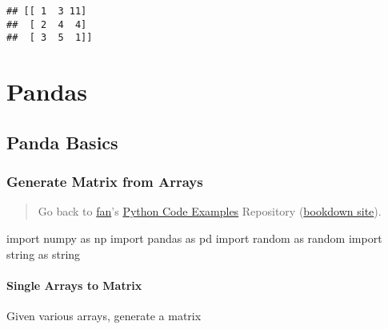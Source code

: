 \documentclass[
]{book}
\newenvironment{Shaded}{\begin{snugshade}}{\end{snugshade}}
\newcommand{\ImportTok}[1]{#1}
\newcommand{\NormalTok}[1]{#1}
\begin{document}
\begin{verbatim}
## [[ 1  3 11]
##  [ 2  4  4]
##  [ 3  5  1]]
\end{verbatim}

\hypertarget{pandas}{%
\chapter{Pandas}\label{pandas}}

\hypertarget{panda-basics}{%
\section{Panda Basics}\label{panda-basics}}

\hypertarget{generate-matrix-from-arrays-1}{%
\subsection{Generate Matrix from Arrays}\label{generate-matrix-from-arrays-1}}

\begin{quote}
Go back to \href{http://fanwangecon.github.io/}{fan}'s \href{https://fanwangecon.github.io/pyfan/}{Python Code Examples} Repository (\href{https://fanwangecon.github.io/pyfan/bookdown}{bookdown site}).
\end{quote}

\begin{Shaded}
\begin{Highlighting}[]
\ImportTok{import}\NormalTok{ numpy }\ImportTok{as}\NormalTok{ np}
\ImportTok{import}\NormalTok{ pandas }\ImportTok{as}\NormalTok{ pd}
\ImportTok{import}\NormalTok{ random }\ImportTok{as}\NormalTok{ random}
\ImportTok{import}\NormalTok{ string }\ImportTok{as}\NormalTok{ string}
\end{Highlighting}
\end{Shaded}

\hypertarget{single-arrays-to-matrix}{%
\subsubsection{Single Arrays to Matrix}\label{single-arrays-to-matrix}}

Given various arrays, generate a matrix
\end{document}

